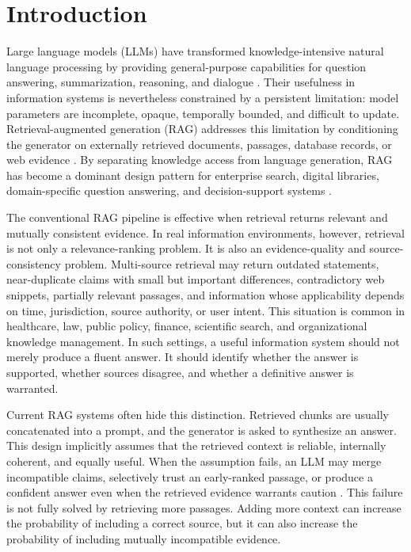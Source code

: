 \documentclass[preprint,12pt,authoryear,nopreprintline]{elsarticle}
\begin{document}
\section{Introduction}
\label{sec:introduction}

Large language models (LLMs) have transformed knowledge-intensive natural language processing by providing general-purpose capabilities for question answering, summarization, reasoning, and dialogue \citep{Vaswani2017,Devlin2019BERT,Brown2020GPT3,OpenAI2023GPT4,Touvron2023Llama,Grattafiori2024Llama3}. Their usefulness in information systems is nevertheless constrained by a persistent limitation: model parameters are incomplete, opaque, temporally bounded, and difficult to update. Retrieval-augmented generation (RAG) addresses this limitation by conditioning the generator on externally retrieved documents, passages, database records, or web evidence \citep{Lewis2020RAG,Guu2020REALM,Izacard2021FiD,Borgeaud2022RETRO}. By separating knowledge access from language generation, RAG has become a dominant design pattern for enterprise search, digital libraries, domain-specific question answering, and decision-support systems \citep{Gao2024RAGSurvey,Asai2024SelfRAG,Yan2024CRAG}.

The conventional RAG pipeline is effective when retrieval returns relevant and mutually consistent evidence. In real information environments, however, retrieval is not only a relevance-ranking problem. It is also an evidence-quality and source-consistency problem. Multi-source retrieval may return outdated statements, near-duplicate claims with small but important differences, contradictory web snippets, partially relevant passages, and information whose applicability depends on time, jurisdiction, source authority, or user intent. This situation is common in healthcare, law, public policy, finance, scientific search, and organizational knowledge management. In such settings, a useful information system should not merely produce a fluent answer. It should identify whether the answer is supported, whether sources disagree, and whether a definitive answer is warranted.

Current RAG systems often hide this distinction. Retrieved chunks are usually concatenated into a prompt, and the generator is asked to synthesize an answer. This design implicitly assumes that the retrieved context is reliable, internally coherent, and equally useful. When the assumption fails, an LLM may merge incompatible claims, selectively trust an early-ranked passage, or produce a confident answer even when the retrieved evidence warrants caution \citep{Ji2023HallucinationSurvey,Maynez2020Faithfulness,Lin2022TruthfulQA,Niu2024RAGTruth}. This failure is not fully solved by retrieving more passages. Adding more context can increase the probability of including a correct source, but it can also increase the probability of including mutually incompatible evidence.
\end{document}
